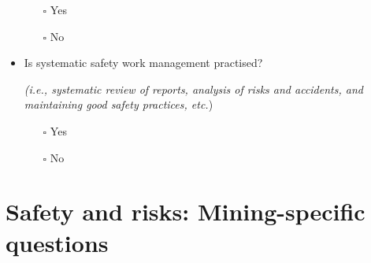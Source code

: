 \documentclass[
  12pt,
]{scrbook}
\providecommand{\tightlist}{%
  \setlength{\itemsep}{0pt}\setlength{\parskip}{0pt}}
\begin{document}
\begin{itemize}
  \begin{itemize}
  \tightlist
  \item[$\square$]
    Yes
  \item[$\square$]
    No
  \end{itemize}
\item
  Is systematic safety work management practised?

  \emph{(i.e., systematic review of reports, analysis of risks and accidents, and maintaining good safety practices, etc.})

  \begin{itemize}
  \tightlist
  \item[$\square$]
    Yes
  \item[$\square$]
    No
  \end{itemize}
\end{itemize}

\hypertarget{safety-and-risks-mining-specific-questions}{%
\section*{Safety and risks: Mining-specific questions}\label{safety-and-risks-mining-specific-questions}}
\end{document}
